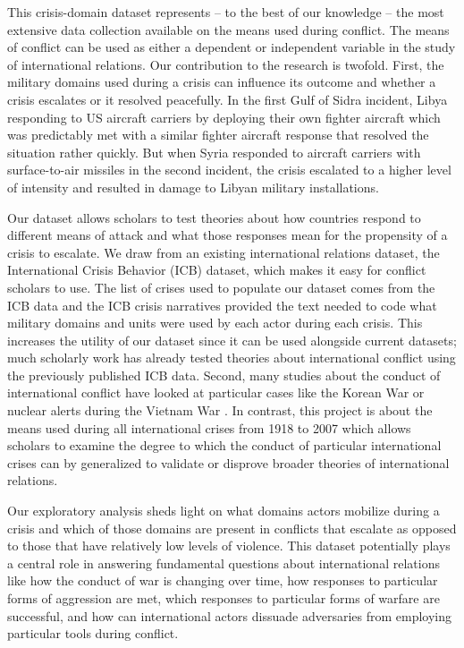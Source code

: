 \documentclass[12pt,letterpaper]{article}
\begin{document}
This crisis-domain dataset represents -- to the best of our knowledge --  the most extensive data collection available on the means used during conflict. The means of conflict can be used as either a dependent or independent variable in the study of international relations. Our contribution to the research is twofold. First, the military domains used during a crisis can influence its outcome and whether a crisis escalates or it resolved peacefully. In the first Gulf of Sidra incident, Libya responding to US aircraft carriers by deploying their own fighter aircraft which was predictably met with a similar fighter aircraft response that resolved the situation rather quickly. But when Syria responded to aircraft carriers with surface-to-air missiles in the second incident, the crisis escalated to a higher level of intensity and resulted in damage to Libyan military installations.

Our dataset allows scholars to test theories about how countries respond to different means of attack and what those responses mean for the propensity of a crisis to escalate. We draw from an existing international relations dataset, the International Crisis Behavior (ICB) dataset, which makes it easy for conflict scholars to use. The list of crises used to populate our dataset comes from the ICB data and the ICB crisis narratives provided the text needed to code what military domains and units were used by each actor during each crisis. This increases the utility of our dataset since it can be used alongside current datasets; much scholarly work has already tested theories about international conflict using the previously published ICB data. Second, many studies about the conduct of international conflict have looked at particular cases like the Korean War \citep{slantchev_feigningweakness_2010} or nuclear alerts during the Vietnam War \citep{sagan_madman_2003}. In contrast, this project is about the means used during all international crises from 1918 to 2007 which allows scholars to examine the degree to which the conduct of particular international crises can by generalized to validate or disprove broader theories of international relations.

Our exploratory analysis sheds light on what domains actors mobilize during a crisis and which of those domains are present in conflicts that escalate as opposed to those that have relatively low levels of violence. This dataset potentially plays a central role in answering fundamental questions about international relations like how the conduct of war is changing over time, how responses to particular forms of aggression are met, which responses to particular forms of warfare are successful, and how can international actors dissuade adversaries from employing particular tools during conflict.
\end{document}
